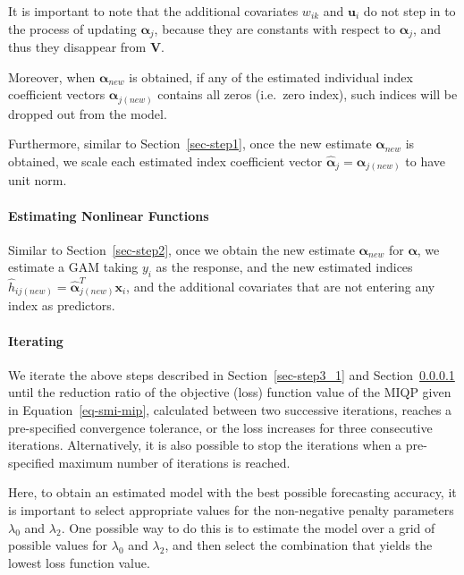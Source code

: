 \documentclass[11pt,a4paper,]{article}
\begin{document}
It is important to note that the additional covariates \(w_{ik}\) and
\(\bm{u}_{i}\) do not step in to the process of updating
\(\bm{\alpha}_{j}\), because they are constants with respect to
\(\bm{\alpha}_{j}\), and thus they disappear from \(\bm{V}\).

Moreover, when \(\bm{\alpha}_{new}\) is obtained, if any of the
estimated individual index coefficient vectors \(\bm{\alpha}_{j(new)}\)
contains all zeros (i.e.~zero index), such indices will be dropped out
from the model.

Furthermore, similar to Section~\ref{sec-step1}, once the new estimate
\(\bm{\alpha}_{new}\) is obtained, we scale each estimated index
coefficient vector \(\hat{\bm{\alpha}}_{j} = \bm{\alpha}_{j(new)}\) to
have unit norm.

\hypertarget{sec-step3_2}{%
\paragraph{Estimating Nonlinear Functions}\label{sec-step3_2}}

Similar to Section~\ref{sec-step2}, once we obtain the new estimate
\(\bm{\alpha}_{new}\) for \(\bm{\alpha}\), we estimate a GAM taking
\(y_{i}\) as the response, and the new estimated indices
\(\hat{h}_{ij(new)} = \hat{\bm{\alpha}}_{j(new)}^{T}\bm{x}_{i}\), and
the additional covariates that are not entering any index as predictors.

\hypertarget{sec-step3_3}{%
\paragraph{Iterating}\label{sec-step3_3}}

We iterate the above steps described in Section~\ref{sec-step3_1} and
Section~\ref{sec-step3_2} until the reduction ratio of the objective
(loss) function value of the MIQP given in Equation~\ref{eq-smi-mip},
calculated between two successive iterations, reaches a pre-specified
convergence tolerance, or the loss increases for three consecutive
iterations. Alternatively, it is also possible to stop the iterations
when a pre-specified maximum number of iterations is reached.

Here, to obtain an estimated model with the best possible forecasting
accuracy, it is important to select appropriate values for the
non-negative penalty parameters \(\lambda_{0}\) and \(\lambda_{2}\). One
possible way to do this is to estimate the model over a grid of possible
values for \(\lambda_{0}\) and \(\lambda_{2}\), and then select the
combination that yields the lowest loss function value.
\end{document}
